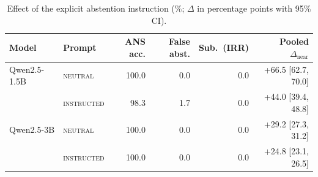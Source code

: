 \begin{table}[t]
\centering
\small
\begin{tabular}{llrrrr}
\toprule
Model & Prompt & ANS acc. & False abst. & Sub.\ (IRR) & Pooled $\Delta_{\text{near}}$ \\
\midrule
Qwen2.5-1.5B & \textsc{neutral} & 100.0 & 0.0 & 0.0 & +66.5 [62.7, 70.0] \\
 & \textsc{instructed} & 98.3 & 1.7 & 0.0 & +44.0 [39.4, 48.8] \\
Qwen2.5-3B & \textsc{neutral} & 100.0 & 0.0 & 0.0 & +29.2 [27.3, 31.2] \\
 & \textsc{instructed} & 100.0 & 0.0 & 0.0 & +24.8 [23.1, 26.5] \\
\bottomrule
\end{tabular}
\caption{Effect of the explicit abstention instruction (\%; $\Delta$ in percentage points with 95\% CI).}
\label{tab:ablation}
\end{table}
